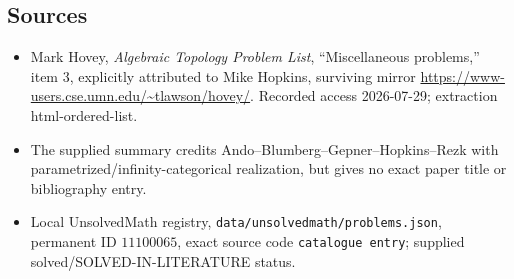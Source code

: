 \documentclass[11pt]{article}
\begin{document}
\subsection{Sources}
\begin{itemize}
\item Mark Hovey, \emph{Algebraic Topology Problem List}, ``Miscellaneous problems,'' item 3, explicitly attributed to Mike Hopkins, surviving mirror \url{https://www-users.cse.umn.edu/~tlawson/hovey/}. Recorded access 2026-07-29; extraction html-ordered-list.
\item The supplied summary credits Ando--Blumberg--Gepner--Hopkins--Rezk with parametrized/infinity-categorical realization, but gives no exact paper title or bibliography entry.
\item Local UnsolvedMath registry, \texttt{data/unsolvedmath/problems.json}, permanent ID \(11100065\), exact source code \texttt{catalogue entry}; supplied solved/SOLVED-IN-LITERATURE status.
\end{itemize}
\end{document}
